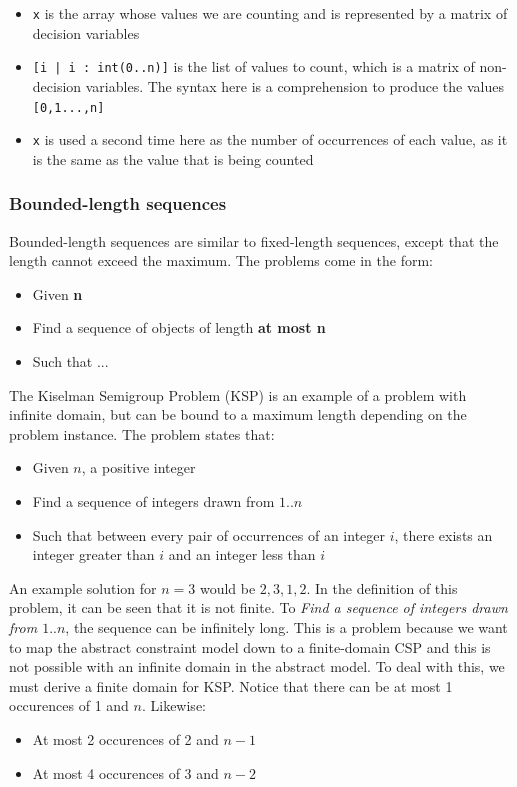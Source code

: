 \documentclass[CS4402-Notes.tex]{subfiles}
\begin{document}
\begin{itemize}
\item \texttt{x} is the array whose values we are counting and is represented by a matrix of decision variables
\item \texttt{[i | i : int(0..n)]} is the list of values to count, which is a matrix of non-decision variables. The syntax here is a comprehension to produce the values \texttt{[0,1...,n]}
\item \texttt{x} is used a second time here as the number of occurrences of each value, as it is the same as the value that is being counted
\end{itemize}

\subsubsection{Bounded-length sequences}
Bounded-length sequences are similar to fixed-length sequences, except that the length cannot exceed the maximum. The problems come in the form:
\begin{itemize}
\item Given \textbf{n}
\item Find a sequence of objects of length \textbf{at most n}
\item Such that ...
\end{itemize}
The Kiselman Semigroup Problem (KSP) is an example of a problem with infinite domain, but can be bound to a maximum length depending on the problem instance. The problem states that:
\begin{itemize}
\item Given $n$, a positive integer
\item Find a sequence of integers drawn from $1..n$
\item Such that between every pair of occurrences of an integer $i$, there exists an integer greater than $i$ and an integer less than $i$
\end{itemize}
An example solution for $n = 3$ would be $2, 3, 1, 2$. In the definition of this problem, it can be seen that it is not finite. To \textit{Find a sequence of integers drawn from $1..n$}, the sequence can be infinitely long. This is a problem because we want to map the abstract constraint model down to a finite-domain CSP and this is not possible with an infinite domain in the abstract model. To deal with this, we must derive a finite domain for KSP. Notice that there can be at most 1 occurences of 1 and $n$. Likewise:
\begin{itemize}
\item At most 2 occurences of 2 and $n - 1$
\item At most 4 occurences of 3 and $n - 2$
\end{itemize}
\end{document}
